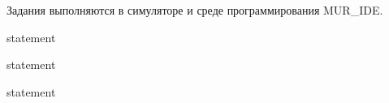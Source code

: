 Задания выполняются в симуляторе и среде программирования MUR\_IDE.

{statement}

{statement}

{statement}